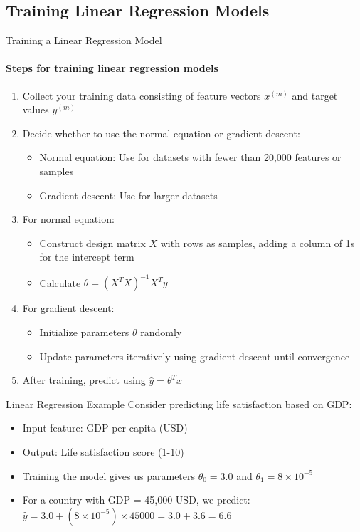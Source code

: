 
\subsection{Training Linear Regression Models}

\begin{KR}{Training a Linear Regression Model}
\paragraph{Steps for training linear regression models}
\begin{enumerate}
    \item Collect your training data consisting of feature vectors $x^{(m)}$ and target values $y^{(m)}$
    \item Decide whether to use the normal equation or gradient descent:
    \begin{itemize}
        \item Normal equation: Use for datasets with fewer than 20,000 features or samples
        \item Gradient descent: Use for larger datasets
    \end{itemize}
    \item For normal equation:
    \begin{itemize}
        \item Construct design matrix $X$ with rows as samples, adding a column of 1s for the intercept term
        \item Calculate $\theta = (X^T X)^{-1}X^T y$
    \end{itemize}
    \item For gradient descent:
    \begin{itemize}
        \item Initialize parameters $\theta$ randomly
        \item Update parameters iteratively using gradient descent until convergence
    \end{itemize}
    \item After training, predict using $\hat{y} = \theta^T x$
\end{enumerate}
\end{KR}

\begin{example2}{Linear Regression Example}
Consider predicting life satisfaction based on GDP:
\begin{itemize}
    \item Input feature: GDP per capita (USD)
    \item Output: Life satisfaction score (1-10)
    \item Training the model gives us parameters $\theta_0 = 3.0$ and $\theta_1 = 8 \times 10^{-5}$
    \item For a country with GDP = 45,000 USD, we predict:
    $\hat{y} = 3.0 + (8 \times 10^{-5}) \times 45000 = 3.0 + 3.6 = 6.6$
\end{itemize}
\end{example2}

